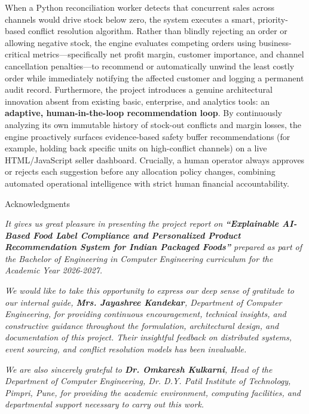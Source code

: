 \documentclass[oneside,a4paper,12pt]{report}
\newcommand{\ProjectTitleMixed}{Explainable AI-Based Food Label Compliance and Personalized Product Recommendation System for Indian Packaged Foods}
\newcommand{\AcademicYear}{2026-2027}
\newcommand{\GuideName}{Mrs. Jayashree Kandekar}
\newcommand{\HODName}{Dr. Omkaresh Kulkarni}
\begin{document}
When a Python reconciliation worker detects that concurrent sales across channels would drive stock below zero, the system executes a smart, priority-based conflict resolution algorithm. Rather than blindly rejecting an order or allowing negative stock, the engine evaluates competing orders using business-critical metrics—specifically net profit margin, customer importance, and channel cancellation penalties—to recommend or automatically unwind the least costly order while immediately notifying the affected customer and logging a permanent audit record. Furthermore, the project introduces a genuine architectural innovation absent from existing basic, enterprise, and analytics tools: an \textbf{adaptive, human-in-the-loop recommendation loop}. By continuously analyzing its own immutable history of stock-out conflicts and margin losses, the engine proactively surfaces evidence-based safety buffer recommendations (for example, holding back specific units on high-conflict channels) on a live HTML/JavaScript seller dashboard. Crucially, a human operator always approves or rejects each suggestion before any allocation policy changes, combining automated operational intelligence with strict human financial accountability.

\newpage
{\bfseries \fontsize{14}{16}\selectfont \centerline{Acknowledgments} \vspace*{1.5\baselineskip}}
\setlength{\parindent}{11mm}

\textit{It gives us great pleasure in presenting the project report on \textbf{``\ProjectTitleMixed''} prepared as part of the Bachelor of Engineering in Computer Engineering curriculum for the Academic Year \AcademicYear.}

\vspace*{1\baselineskip}
\textit{We would like to take this opportunity to express our deep sense of gratitude to our internal guide, \textbf{\GuideName}, Department of Computer Engineering, for providing continuous encouragement, technical insights, and constructive guidance throughout the formulation, architectural design, and documentation of this project. Their insightful feedback on distributed systems, event sourcing, and conflict resolution models has been invaluable.}

\vspace*{1\baselineskip}
\textit{We are also sincerely grateful to \textbf{\HODName}, Head of the Department of Computer Engineering, Dr. D.Y. Patil Institute of Technology, Pimpri, Pune, for providing the academic environment, computing facilities, and departmental support necessary to carry out this work.}
\end{document}
